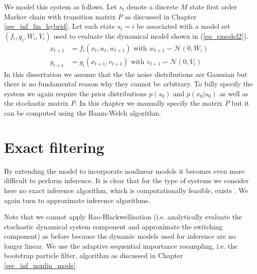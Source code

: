 We model this system as follows. Let $s_t$ denote a discrete $M$ state first order Markov chain with transition matrix $P$ as discussed in Chapter \ref{sec_inf_lin_hybrid}. Let each state $s_t=i$ be associated with a model set $\left(f_i, g_i, W_i, V_i \right)$ used to evaluate the dynamical model shown in (\ref{eq_smodel2}).
\begin{equation}
\begin{aligned}
x_{t+1} &= f_i(x_t, u_t, w_{t+1}) \text{ with } w_{t+1} \backsim \mathcal{N}(0, W_i)\\
y_{t+1} &= g_i(x_{t+1}, v_{t+1}) \text{ with } v_{t+1} \backsim \mathcal{N}(0,V_i)
\end{aligned}
\label{eq_smodel2}
\end{equation}
In this dissertation we assume that the the noise distributions are Gaussian but there is no fundamental reason why they cannot be arbitrary. To fully specify the system we again require the prior distributions $p(s_0)$ and $p(x_0|s_0)$ as well as the stochastic matrix $P$. In this chapter we manually specify the matrix $P$ but it can be computed using the Baum-Welch algorithm. 
\section{Exact filtering}
By extending the model to incorporate nonlinear models it becomes even more difficult to perform inference. It is clear that for the type of systems we consider here no exact inference algorithm, which is computationally feasible, exists \cite{murphy1}. We again turn to approximate inference algorithms.

Note that we cannot apply Rao-Blackwellisation (i.e. analytically evaluate the stochastic dynamical system component and approximate the switching component) as before because the dynamic models used for inference are no longer linear. We use the adaptive sequential importance resampling, i.e. the bootstrap particle filter, algorithm as discussed in Chapter \ref{sec_inf_nonlin_mods}.
